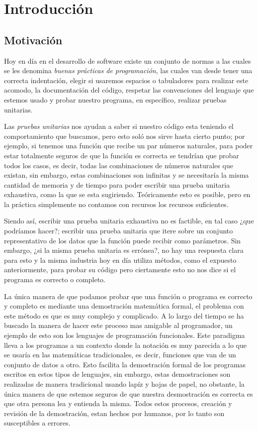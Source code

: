 \chapter{Introducción}

\section{Motivación}
Hoy en día en el desarrollo de software existe un conjunto de normas a las cuales se les denomina
\textit{buenas pr\'acticas de programaci\'on}, las cuales van desde tener una correcta
indentaci\'on, elegir si usaremos espacios o tabuladores para realizar este acomodo, la
documentaci\'on del c\'odigo, respetar las convenciones del lenguaje que estemos usado y probar
nuestro programa, en espec\'ifico, realizar pruebas unitarias.

Las \textit{pruebas unitarias} nos ayudan a saber si nuestro código esta teniendo el comportamiento
que buscamos, pero esto sol\'o nos sirve hasta cierto punto; por ejemplo, si tenemos una funci\'on
que recibe un par números naturales, para poder estar totalmente seguros de que la funci\'on es
correcta se tendrían que probar todos los casos, es decir, todas las combinaciones de números
naturales que existan, sin embargo, estas combinaciones son infinitas y se necesitaría la misma
cantidad de memoria y de tiempo para poder escribir una prueba unitaria exhaustiva, como la que se
esta sugiriendo. Teóricamente esto es posible, pero en la pr\'actica simplemente no contamos con
recursos los recursos suficientes.

Siendo as\'i, escribir una prueba unitaria exhaustiva no es factible, en tal caso ¿que podríamos
hacer?; escribir una prueba unitaria que itere sobre un conjunto representativo de los datos que la
funci\'on puede recibir como par\'ametros. Sin embargo, ¿si la misma prueba unitaria es errónea?,
no hay una respuesta clara para esto y la misma industria hoy en día utiliza métodos, como el
expuesto anteriormente, para probar su c\'odigo pero ciertamente esto no nos dice si el programa es
correcto o completo.

La única manera de que podamos probar que una función o programa es correcto y completo es mediante
una demostraci\'on matemática formal, el problema con este método es que es muy complejo y
complicado. A lo largo del tiempo se ha buscado la manera de hacer este proceso mas amigable al
programador, un ejemplo de esto son los lenguajes de programación funcionales. Este paradigma lleva
a los programas a un contexto donde la notaci\'on es muy parecida a lo que se usar\'ia en las
matemáticas tradicionales, es decir, funciones que van de un conjunto de datos a otro. Esto
facilita la demostraci\'on formal de los programas escritos en estos tipos de lenguajes, sin
embargo, estas demostraciones son realizadas de manera tradicional usando lap\'iz y hojas de papel,
no obstante, la \'unica manera de que estemos seguros de que nuestra desmostraci\'on es correcta es
que otra persona lea y entienda la misma. Todos estos procesos, creaci\'on y revisi\'on de la
demostraci\'on, estan hechos por humanos, por lo tanto son susceptibles a errores.

